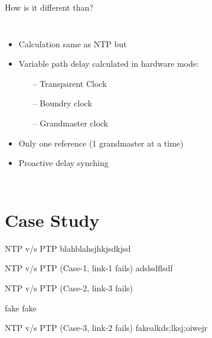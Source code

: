 \documentclass{beamer}
\begin{document}
    \begin{frame}{How is it different than?}
    	\begin{columns}
   		

    		\begin{itemize}
    			\item Calculation same as NTP but
    			\item Variable path delay calculated in hardware mode:
    			\begin{itemize}
    				\item[--] Transparent Clock 
 	    			\item[--] Boundry clock 
 	    			\item[--] Grandmaster clock
    			\end{itemize} 
    			\item Only one reference (1 grandmaster at a time)
    			\item Proactive delay synching 
    		\end{itemize}
    	\end{columns}
   
    \end{frame}
      
      \section{Case Study}
    \begin{frame}{NTP v/s PTP}
blahblahsjhkjsdkjsd
   \end{frame}

    \begin{frame}{NTP v/s PTP \small(Case-1, link-1 fails)}
adslsdflsdf
    \end{frame}

    \begin{frame}{NTP v/s PTP \small(Case-2, link-3 fails)}

fake fake
    \end{frame}

    \begin{frame}{NTP v/s PTP \small(Case-3, link-2 fails)}
fakealkds;lksj;oiwejr
    \end{frame}
\end{document}
